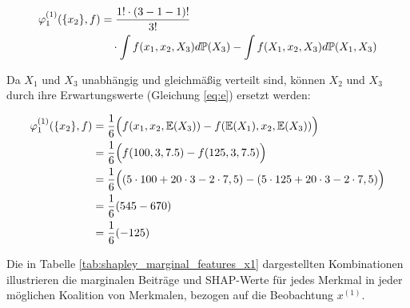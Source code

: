 \begin{align}
    \varphi^{(1)}_{1}(\{x_2\}, f) &= \frac{1! \cdot (3 - 1 - 1)!}{3!} \\ \notag
        &\quad \cdot \int f(x_1, x_2 , X_3) d\mathbb{P}(X_3) - \int f(X_1, x_2, X_3) d\mathbb{P}(X_1, X_3)
\end{align}

Da \( X_1 \) und \( X_3 \) unabhängig und gleichmäßig verteilt sind, können \( X_2 \) und \( X_3 \) durch ihre Erwartungswerte (Gleichung \ref{eq:e}) ersetzt werden:

\begin{align}
    \varphi^{(1)}_{1}(\{x_2\}, f) &= \frac{1}{6} \Big(f(x_1, x_2, \mathbb{E}(X_3)) - f(\mathbb{E}(X_1), x_2, \mathbb{E}(X_3))\Big) \\ \notag
        &= \frac{1}{6} \Big( f(100, 3, 7.5) - f(125, 3, 7.5) \Big) \\ \notag
        &= \frac{1}{6} \Big( (5 \cdot 100 + 20 \cdot 3 - 2 \cdot 7,5) - (5 \cdot 125 + 20 \cdot 3 - 2 \cdot 7,5) \Big) \\ \notag
        &= \frac{1}{6} (545 - 670) \\ \notag
        &= \frac{1}{6} (-125)
\end{align}
 
Die in Tabelle \ref{tab:shapley_marginal_features_x1} dargestellten Kombinationen illustrieren die marginalen Beiträge und SHAP-Werte 
für jedes Merkmal in jeder möglichen Koalition von Merkmalen, bezogen auf die Beobachtung $x^{(1)}$. 

